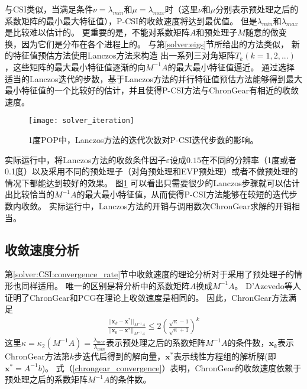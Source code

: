 与CSI类似，当满足条件$\nu = \lambda_{min}$和$\mu =\lambda_{max}$时（这里$\nu$和$\mu$分别表示预处理之后的系数矩阵的最小最大特征值），P-CSI的收敛速度将达到最优值。 
但是$\lambda_{min}$和$\lambda_{max}$是比较难以估计的。
更重要的是，不能对系数矩阵$A$和预处理子$M$随意的做变换，因为它们是分布在各个进程上的。
与第\ref{solver:eigs}节所给出的方法类似，
新的特征值预估方法使用Lanczos方法来构造 出一系列三对角矩阵$T_k(k=1,2,...)$，这些矩阵的最大最小特征值逐渐的向$M^{-1}A$的最大最小特征值逼近。
通过选择适当的Lanczos迭代的步数，基于Lanczos方法的并行特征值预估方法能够得到最大最小特征值的一个比较好的估计，并且使得P-CSI方法与ChronGear有相近的收敛速度。  
  

\begin {figure}[!t]
\begin{center}
\texttt{[image: solver\_iteration]}
\caption []{1度POP中，Lanczos方法的迭代次数对P-CSI迭代步数的影响。 \label{fig:iter}}
\end{center}
\end {figure}
实际运行中，将Lanczos方法的收敛条件因子$\varepsilon$设成$0.15$在不同的分辨率（1度或者0.1度）以及采用不同的预处理子（对角预处理和EVP预处理）或者不做预处理的情况下都能达到较好的效果。 
图\ref{fig:iter} 可以看出只需要很少的Lanczos步骤就可以估计出比较恰当的$M^{-1}A$的最大最小特征值，从而使得P-CSI方法能够在较短的迭代步数内收敛。
实际运行中，Lanczos方法的开销与调用数次ChronGear求解的开销相当。 

\subsection{收敛速度分析}
\label{precond:converge}

第\ref{solver:CSI:convergence_rate}节中收敛速度的理论分析对于采用了预处理子的情形也同样适用。
唯一的区别是将分析中的系数矩阵$A$换成$M^{-1}A$。
D'Azevedo\cite{dAzevedo1999lapack}等人证明了ChronGear和PCG在理论上收敛速度是相同的。
因此，ChronGear方法满足 
\begin{align}
\label{chrongear_convergence}
\frac{||\textbf{x}_k-\textbf{x}^*||_{M^{-1}A}}{||\textbf{x}_0-\textbf{x}^*||_{M^{-1}A}}\le  2 (\frac{\sqrt{\kappa}-1}{\sqrt{\kappa}+1})^k 
\end{align}
这里$\kappa =  \kappa_2({M^{-1}A}) = \frac{\lambda_{max}}{\lambda_{min}}$表示预处理之后的系数矩阵${M^{-1}A}$的条件数，$\textbf{x}_k$表示ChronGear方法第$k$步迭代后得到的解向量，$\textbf{x}^*$表示线性方程组的解析解(即$\textbf{x}^* = A^{-1}b$)。
式（\ref{chrongear_convergence}）表明，ChronGear的收敛速度依赖于预处理之后的系数矩阵${M^{-1}A}$的条件数。 


